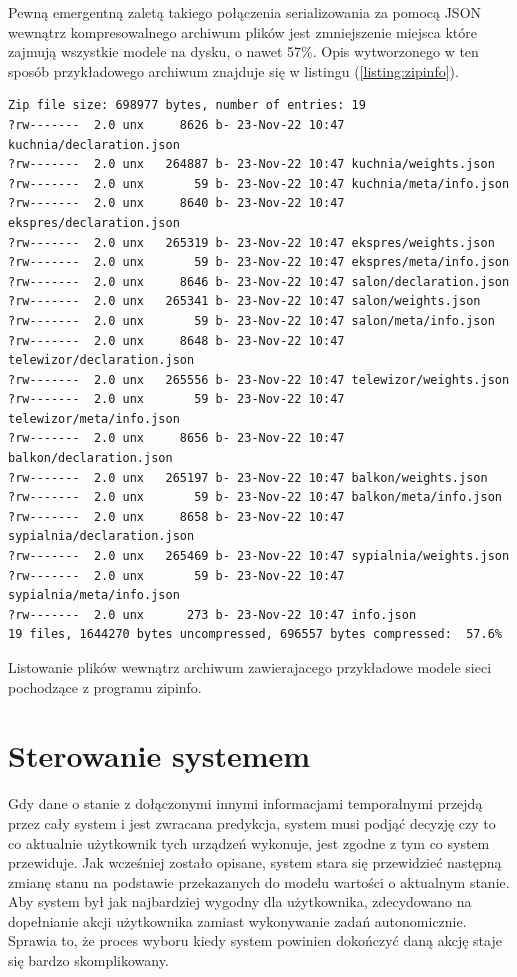 Pewną emergentną zaletą takiego połączenia serializowania za pomocą JSON wewnątrz kompresowalnego archiwum plików jest zmniejszenie miejsca które zajmują wszystkie modele na dysku, o nawet 57\%. Opis wytworzonego w ten sposób przykładowego archiwum znajduje się w listingu (\ref{listing:zipinfo}).

\begin{listing}
\begin{verbatim}
Zip file size: 698977 bytes, number of entries: 19
?rw-------  2.0 unx     8626 b- 23-Nov-22 10:47 kuchnia/declaration.json
?rw-------  2.0 unx   264887 b- 23-Nov-22 10:47 kuchnia/weights.json
?rw-------  2.0 unx       59 b- 23-Nov-22 10:47 kuchnia/meta/info.json
?rw-------  2.0 unx     8640 b- 23-Nov-22 10:47 ekspres/declaration.json
?rw-------  2.0 unx   265319 b- 23-Nov-22 10:47 ekspres/weights.json
?rw-------  2.0 unx       59 b- 23-Nov-22 10:47 ekspres/meta/info.json
?rw-------  2.0 unx     8646 b- 23-Nov-22 10:47 salon/declaration.json
?rw-------  2.0 unx   265341 b- 23-Nov-22 10:47 salon/weights.json
?rw-------  2.0 unx       59 b- 23-Nov-22 10:47 salon/meta/info.json
?rw-------  2.0 unx     8648 b- 23-Nov-22 10:47 telewizor/declaration.json
?rw-------  2.0 unx   265556 b- 23-Nov-22 10:47 telewizor/weights.json
?rw-------  2.0 unx       59 b- 23-Nov-22 10:47 telewizor/meta/info.json
?rw-------  2.0 unx     8656 b- 23-Nov-22 10:47 balkon/declaration.json
?rw-------  2.0 unx   265197 b- 23-Nov-22 10:47 balkon/weights.json
?rw-------  2.0 unx       59 b- 23-Nov-22 10:47 balkon/meta/info.json
?rw-------  2.0 unx     8658 b- 23-Nov-22 10:47 sypialnia/declaration.json
?rw-------  2.0 unx   265469 b- 23-Nov-22 10:47 sypialnia/weights.json
?rw-------  2.0 unx       59 b- 23-Nov-22 10:47 sypialnia/meta/info.json
?rw-------  2.0 unx      273 b- 23-Nov-22 10:47 info.json
19 files, 1644270 bytes uncompressed, 696557 bytes compressed:  57.6%
\end{verbatim}
\caption{Listowanie plików wewnątrz archiwum zawierajacego przykładowe modele sieci pochodzące z programu zipinfo.} \label{listing:zipinfo}
\end{listing}

\section{Sterowanie systemem}
Gdy dane o stanie z dołączonymi innymi informacjami temporalnymi przejdą przez cały system i jest zwracana predykcja, system musi podjąć decyzję czy to co aktualnie użytkownik tych urządzeń wykonuje, jest zgodne z tym co system przewiduje. Jak wcześniej zostało opisane, system stara się przewidzieć następną zmianę stanu na podstawie przekazanych do modelu wartości o aktualnym stanie. Aby system był jak najbardziej wygodny dla użytkownika, zdecydowano na dopełnianie akcji użytkownika zamiast wykonywanie zadań autonomicznie. Sprawia to, że proces wyboru kiedy system powinien dokończyć daną akcję staje się bardzo skomplikowany.

